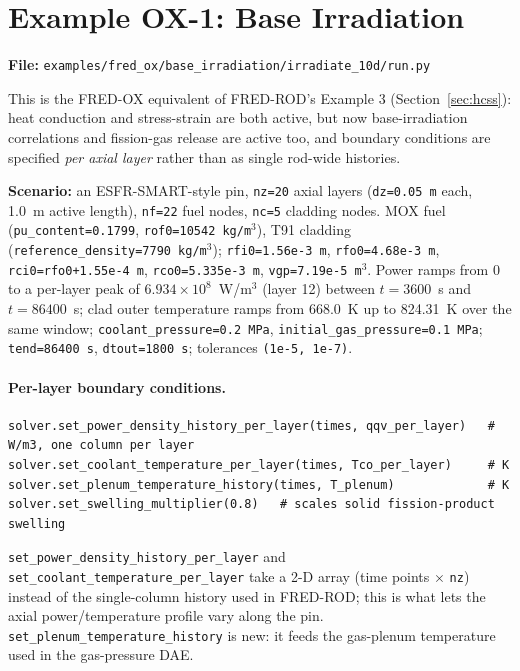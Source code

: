 \documentclass[11pt,a4paper]{article}
\begin{document}
\section{Example OX-1: Base Irradiation}
\label{sec:ox-base}

\textbf{File:} \texttt{examples/fred\_ox/base\_irradiation/irradiate\_10d/run.py}

\medskip
This is the FRED-OX equivalent of FRED-ROD's Example 3
(Section~\ref{sec:hcss}): heat conduction and stress-strain are both active,
but now base-irradiation correlations and fission-gas release are active
too, and boundary conditions are specified \emph{per axial layer} rather
than as single rod-wide histories.

\textbf{Scenario:} an ESFR-SMART-style pin, \texttt{nz=20} axial layers
(\texttt{dz=0.05~m} each, 1.0~m active length), \texttt{nf=22} fuel nodes,
\texttt{nc=5} cladding nodes.  MOX fuel (\texttt{pu\_content=0.1799},
\texttt{rof0=10542~kg/m$^3$}), T91 cladding
(\texttt{reference\_density=7790~kg/m$^3$}); \texttt{rfi0=1.56e-3~m},
\texttt{rfo0=4.68e-3~m}, \texttt{rci0=rfo0+1.55e-4~m}, \texttt{rco0=5.335e-3~m},
\texttt{vgp=7.19e-5~m$^3$}.  Power ramps from 0 to a per-layer peak of
$6.934\times10^8$~W/m$^3$ (layer 12) between $t=3600$~s and $t=86400$~s;
clad outer temperature ramps from 668.0~K up to 824.31~K over the same
window; \texttt{coolant\_pressure=0.2~MPa}, \texttt{initial\_gas\_pressure=0.1~MPa};
\texttt{tend=86400~s}, \texttt{dtout=1800~s}; tolerances \texttt{(1e-5, 1e-7)}.

\paragraph{Per-layer boundary conditions.}

\begin{lstlisting}
solver.set_power_density_history_per_layer(times, qqv_per_layer)   # W/m3, one column per layer
solver.set_coolant_temperature_per_layer(times, Tco_per_layer)     # K
solver.set_plenum_temperature_history(times, T_plenum)             # K
solver.set_swelling_multiplier(0.8)   # scales solid fission-product swelling
\end{lstlisting}

\texttt{set\_power\_density\_history\_per\_layer} and
\texttt{set\_coolant\_temperature\_per\_layer} take a 2-D array (time points
$\times$ \texttt{nz}) instead of the single-column history used in FRED-ROD;
this is what lets the axial power/temperature profile vary along the pin.
\texttt{set\_plenum\_temperature\_history} is new: it feeds the gas-plenum
temperature used in the gas-pressure DAE.
\end{document}
